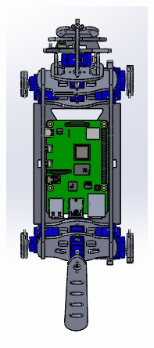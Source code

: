 \documentclass[runningheads,a4paper,12pt]{report}
\begin{document}
\begin{figure}[H]
\begin{subfigure}{.2\textwidth}
  		\includegraphics[width=\linewidth]{./images/3_hard_up}

\end{subfigure}
\end{figure}
\end{document}
